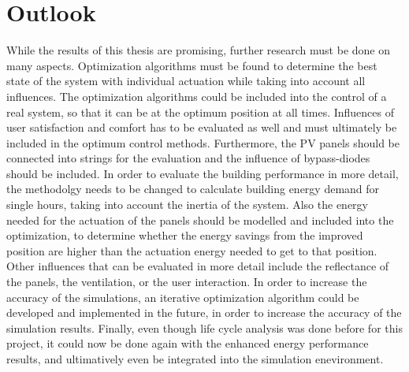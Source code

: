 \chapter{Outlook}
\label{ch:outlook}

While the results of this thesis are promising, further research must be done on many aspects. Optimization algorithms must be found to determine the best state of the system with individual actuation while taking into account all influences. The optimization algorithms could be included into the control of a real system, so that it can be at the optimum position at all times. Influences of user satisfaction and comfort has to be evaluated as well and must ultimately be included in the optimum control methods. Furthermore, the PV panels should be connected into strings for the evaluation and the influence of bypass-diodes should be included. In order to evaluate the building performance in more detail, the methodolgy needs to be changed to calculate building energy demand for single hours, taking into account the inertia of the system. Also the energy needed for the actuation of the panels should be modelled and included into the optimization, to determine whether the energy savings from the improved position are higher than the actuation energy needed to get to that position. Other influences that can be evaluated in more detail include the reflectance of the panels, the ventilation, or the user interaction. In order to increase the accuracy of the simulations, an iterative optimization algorithm could be developed and implemented in the future, in order to increase the accuracy of the simulation results. Finally, even though life cycle analysis was done before for this project, it could now be done again with the enhanced energy performance results, and ultimatively even be integrated into the simulation enevironment. 






